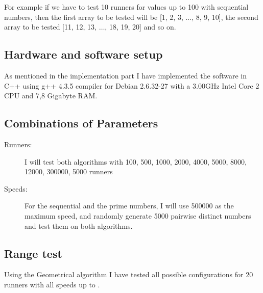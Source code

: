 For example if we have to test 10 runners for values up to 100 with sequential numbers, then the first array to be tested will be [1, 2, 3, $\ldots$, 8, 9, 10], the second array to be tested [11, 12, 13, $\ldots$, 18, 19, 20] and so on.

\subsection{Hardware and software setup}
As mentioned in the implementation part I have implemented the software in C++ using g++ 4.3.5 compiler for Debian 2.6.32-27 with a 3.00GHz Intel Core 2 CPU and 7,8 Gigabyte RAM.

\subsection{Combinations of Parameters} 

\begin{description}
\item[Runners:] I will test both algorithms with 100, 500, 1000, 2000, 4000, 5000, 8000, 12000, 300000, 5000 runners 
\item[Speeds:] For the sequential and the prime numbers, I will use
  500000 as the maximum speed, and randomly generate 5000 pairwise distinct numbers and test them on both algorithms.
\end{description}

\subsection{Range test}
Using the Geometrical algorithm I have tested all possible configurations for 20 runners with all speeds up to \maxNumbers.
